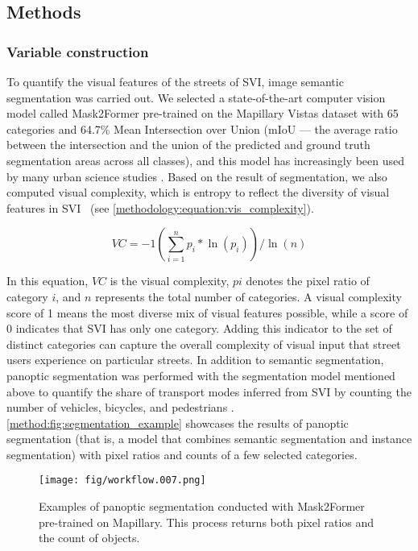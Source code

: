 \documentclass[preprint,12pt, authoryear]{elsarticle}
\begin{document}
\subsection{Methods}
\subsubsection{Variable construction}
To quantify the visual features of the streets of SVI, image semantic segmentation was carried out. 
We selected a state-of-the-art computer vision model called Mask2Former pre-trained on the Mapillary Vistas dataset with 65 categories and 64.7\% Mean Intersection over Union (mIoU --- the average ratio between the intersection and the union of the predicted and ground truth segmentation areas across all classes), and this model has increasingly been used by many urban science studies \citep{cheng_maskedattention_2022, yap_urbanity_2023, li_evaluation_2023, yap_global_2023}.
Based on the result of segmentation, we also computed visual complexity, which is entropy to reflect the diversity of visual features in SVI~\citep{2023_epb_semantic_networks} (see \autoref{methodology:equation:vis_complexity}).

\begin{equation}
VC =-1\left(\sum_{i=1}^{n} p_{i} * \ln (p_{i})\right) / \ln (n)
\label{methodology:equation:vis_complexity}
\end{equation}

In this equation, $VC$ is the visual complexity, $pi$ denotes the pixel ratio of category $i$, and $n$ represents the total number of categories. A visual complexity score of 1 means the most diverse mix of visual features possible, while a score of 0 indicates that SVI has only one category. Adding this indicator to the set of distinct categories can capture the overall complexity of visual input that street users experience on particular streets. In addition to semantic segmentation, panoptic segmentation was performed with the segmentation model mentioned above to quantify the share of transport modes inferred from SVI by counting the number of vehicles, bicycles, and pedestrians \citep{carion_endtoend_2020, lin_microsoft_2015}. 
\autoref{method:fig:segmentation_example} showcases the results of panoptic segmentation (that is, a model that combines semantic segmentation and instance segmentation) with pixel ratios and counts of a few selected categories.

\begin{figure}[!htp]
    \centering
    \texttt{[image: fig/workflow.007.png]} 
    \caption{Examples of panoptic segmentation conducted with Mask2Former pre-trained on Mapillary. This process returns both pixel ratios and the count of objects.}
    \label{method:fig:segmentation_example}
\end{figure}
\end{document}
